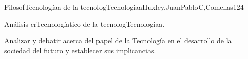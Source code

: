 \begin{syllabus}
\begin{unit}{FilosofTecnologíaa de la tecnologTecnologíaa}{Huxley,JuanPabloC,Comellas}{12}{4}
\begin{topics}
      \item {Análisis crTecnologíatico de la tecnologTecnologíaa.}
\end{topics}
\begin{unitgoals}
	\item Analizar  y debatir acerca del papel de la Tecnología en el desarrollo de la sociedad del futuro y establecer  sus implicancias. 
\end{unitgoals}
\end{unit}



\begin{coursebibliography}
\end{coursebibliography}

\end{syllabus}

%

